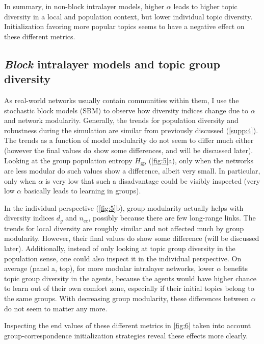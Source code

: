 

In summary, in non-block intralayer models, higher $\alpha$ leads to higher topic diversity in a local and population context, but lower individual topic diversity. Initialization favoring more popular topics seems to have a negative effect on these different metrics.


\subsection{\textit{Block} intralayer models and topic group diversity}

As real-world networks usually contain communities within them, I use the stochastic block models (SBM) to observe how diversity indices change due to $\alpha$ and network modularity. Generally, the trends for population diversity and robustness during the simulation are similar from previously discussed (\autoref{supp:4}). The trends as a function of model modularity do not seem to differ much either (however the final values do show some differences, and will be discussed later). Looking at the group population entropy $H_{\mathrm{gp}}$ (\autoref{fig:5}a), only when the networks are less modular do such values show a difference, albeit very small. In particular, only when $\alpha$ is very low that such a disadvantage could be visibly inspected (very low $\alpha$ basically leads to learning in groups).

In the individual perspective (\autoref{fig:5}b), group modularity actually helps with diversity indices $d_g$ and $n_{\mathrm{cc}}$, possibly because there are few long-range links. The trends for local diversity are roughly similar and not affected much by group modularity. However, their final values do show some difference (will be discussed later). Additionally, instead of only looking at topic group diversity in the population sense, one could also inspect it in the individual perspective. On average (panel a, top), for more modular intralayer networks, lower $\alpha$ benefits topic group diversity in the agents, because the agents would have higher chance to learn out of their own comfort zone, especially if their initial topics belong to the same groups. With decreasing group modularity, these differences between $\alpha$ do not seem to matter any more.



Inspecting the end values of these different metrics in \autoref{fig:6} taken into account group-correspondence initialization strategies reveal these effects more clearly.

